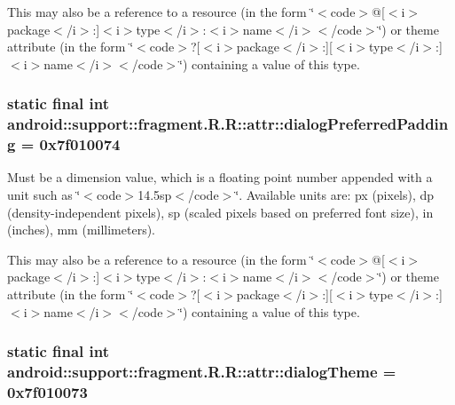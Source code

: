 This may also be a reference to a resource (in the form \char`\"{}$<$code$>$@\mbox{[}$<$i$>$package$<$/i$>$:\mbox{]}$<$i$>$type$<$/i$>$:$<$i$>$name$<$/i$>$$<$/code$>$\char`\"{}) or theme attribute (in the form \char`\"{}$<$code$>$?\mbox{[}$<$i$>$package$<$/i$>$:\mbox{]}\mbox{[}$<$i$>$type$<$/i$>$:\mbox{]}$<$i$>$name$<$/i$>$$<$/code$>$\char`\"{}) containing a value of this type. \hypertarget{classandroid_1_1support_1_1fragment_1_1_r_1_1attr_96417f2130e9efe7e0ea6e91fda4de2f}{
\subsubsection[{dialogPreferredPadding}]{\setlength{\rightskip}{0pt plus 5cm}static final int android::support::fragment.R.R::attr::dialogPreferredPadding = 0x7f010074}}
\label{classandroid_1_1support_1_1fragment_1_1_r_1_1attr_96417f2130e9efe7e0ea6e91fda4de2f}


Must be a dimension value, which is a floating point number appended with a unit such as \char`\"{}$<$code$>$14.5sp$<$/code$>$\char`\"{}. Available units are: px (pixels), dp (density-independent pixels), sp (scaled pixels based on preferred font size), in (inches), mm (millimeters). 

This may also be a reference to a resource (in the form \char`\"{}$<$code$>$@\mbox{[}$<$i$>$package$<$/i$>$:\mbox{]}$<$i$>$type$<$/i$>$:$<$i$>$name$<$/i$>$$<$/code$>$\char`\"{}) or theme attribute (in the form \char`\"{}$<$code$>$?\mbox{[}$<$i$>$package$<$/i$>$:\mbox{]}\mbox{[}$<$i$>$type$<$/i$>$:\mbox{]}$<$i$>$name$<$/i$>$$<$/code$>$\char`\"{}) containing a value of this type. \hypertarget{classandroid_1_1support_1_1fragment_1_1_r_1_1attr_305c57112b40efa6e949199332e03a7f}{
\subsubsection[{dialogTheme}]{\setlength{\rightskip}{0pt plus 5cm}static final int android::support::fragment.R.R::attr::dialogTheme = 0x7f010073}}
\label{classandroid_1_1support_1_1fragment_1_1_r_1_1attr_305c57112b40efa6e949199332e03a7f}


